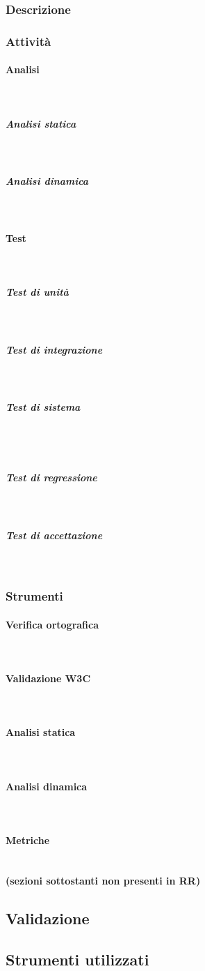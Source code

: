 	\subsubsection{Descrizione}
	\subsubsection{Attività}
	\paragraph{Analisi} \mbox{}\\
	\subparagraph{Analisi statica} \mbox{}\\
	\subparagraph{Analisi dinamica} \mbox{}\\
	\paragraph{Test} \mbox{}\\	
	\subparagraph{Test di unità} \mbox{}\\
	\subparagraph{Test di integrazione} \mbox{}\\
	\subparagraph{Test di sistema} \mbox{}\\\\
	\subparagraph{Test di regressione} \mbox{}\\
	\subparagraph{Test di accettazione} \mbox{}\\
	\subsubsection{Strumenti}
	\paragraph{Verifica ortografica} \mbox{}\\
	\paragraph{Validazione W3C} \mbox{}\\
	\paragraph{Analisi statica} \mbox{}\\
	\paragraph{Analisi dinamica} \mbox{}\\
	\paragraph{Metriche} \mbox{}\\
	
	\textbf{(sezioni sottostanti non presenti in RR)}
	\subsection{Validazione}
	\subsection{Strumenti utilizzati}
	
